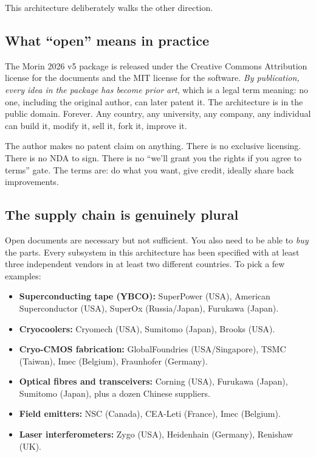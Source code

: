 \documentclass[11pt,letterpaper]{article}
\begin{document}
This architecture deliberately walks the other direction.

\subsection{What ``open'' means in practice}

The Morin 2026 v5 package is released under the Creative Commons Attribution license for the documents and the MIT license for the software. \emph{By publication, every idea in the package has become prior art}, which is a legal term meaning: no one, including the original author, can later patent it. The architecture is in the public domain. Forever. Any country, any university, any company, any individual can build it, modify it, sell it, fork it, improve it.

The author makes no patent claim on anything. There is no exclusive licensing. There is no NDA to sign. There is no ``we'll grant you the rights if you agree to terms'' gate. The terms are: do what you want, give credit, ideally share back improvements.

\subsection{The supply chain is genuinely plural}

Open documents are necessary but not sufficient. You also need to be able to \emph{buy} the parts. Every subsystem in this architecture has been specified with at least three independent vendors in at least two different countries. To pick a few examples:

\begin{itemize}[leftmargin=1.6em]
  \item \textbf{Superconducting tape (YBCO):} SuperPower (USA), American Superconductor (USA), SuperOx (Russia/Japan), Furukawa (Japan).
  \item \textbf{Cryocoolers:} Cryomech (USA), Sumitomo (Japan), Brooks (USA).
  \item \textbf{Cryo-CMOS fabrication:} GlobalFoundries (USA/Singapore), TSMC (Taiwan), Imec (Belgium), Fraunhofer (Germany).
  \item \textbf{Optical fibres and transceivers:} Corning (USA), Furukawa (Japan), Sumitomo (Japan), plus a dozen Chinese suppliers.
  \item \textbf{Field emitters:} NSC (Canada), CEA-Leti (France), Imec (Belgium).
  \item \textbf{Laser interferometers:} Zygo (USA), Heidenhain (Germany), Renishaw (UK).
\end{itemize}
\end{document}
